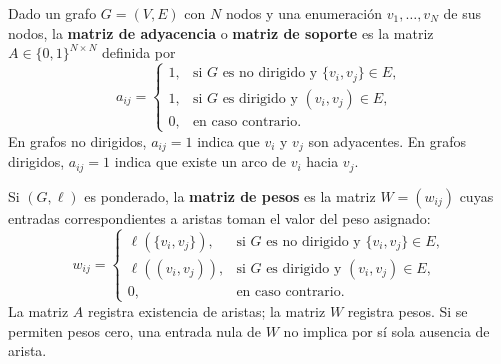             \begin{definicion}
                Dado un grafo $G=(V,E)$ con $N$ nodos y una enumeración $v_1,\dots,v_N$ de sus nodos, la \textbf{matriz de adyacencia} o \textbf{matriz de soporte} es la matriz $A\in\{0,1\}^{N\times N}$ definida por
                \[
                a_{ij} =
                \begin{cases}
                1, & \text{si }G\text{ es no dirigido y }\{v_i,v_j\}\in E,\\
                1, & \text{si }G\text{ es dirigido y }(v_i,v_j)\in E,\\
                0, & \text{en caso contrario.}
                \end{cases}
                \]
                En grafos no dirigidos, $a_{ij}=1$ indica que $v_i$ y $v_j$ son adyacentes. En grafos dirigidos, $a_{ij}=1$ indica que existe un arco de $v_i$ hacia $v_j$.

                Si $(G,\ell)$ es ponderado, la \textbf{matriz de pesos} es la matriz $W=(w_{ij})$ cuyas entradas correspondientes a aristas toman el valor del peso asignado:
                \[
                w_{ij} =
                \begin{cases}
                \ell(\{v_i,v_j\}), & \text{si }G\text{ es no dirigido y }\{v_i,v_j\}\in E,\\
                \ell((v_i,v_j)), & \text{si }G\text{ es dirigido y }(v_i,v_j)\in E,\\
                0, & \text{en caso contrario.}
                \end{cases}
                \]
                La matriz $A$ registra existencia de aristas; la matriz $W$ registra pesos. Si se permiten pesos cero, una entrada nula de $W$ no implica por sí sola ausencia de arista.

            \end{definicion}

